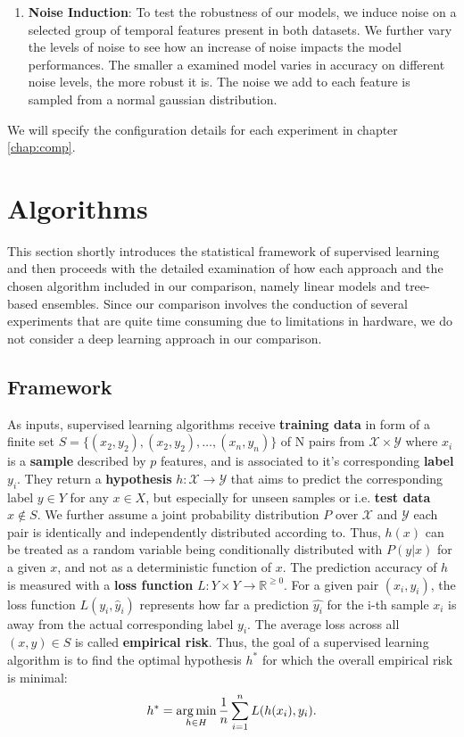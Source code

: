 \begin{enumerate}
	\item \textbf{Noise Induction}: To test the robustness of our models, we induce noise on a selected group of temporal features present in both datasets. We further vary the levels of noise to see how an increase of noise impacts the model performances. The smaller a examined model varies in accuracy on different noise levels, the more robust it is. The noise we add to each feature is sampled from a normal gaussian distribution. 
\end{enumerate}
We will specify the configuration details for each experiment in chapter \ref{chap:comp}.
\section{Algorithms}

This section shortly introduces the statistical framework of supervised learning and then proceeds with the detailed examination of how each approach and the chosen algorithm included in our comparison, namely linear models and tree-based ensembles. Since our comparison involves the conduction of several experiments that are quite time consuming due to limitations in hardware, we do not consider a deep learning approach in our comparison. 

\subsection{Framework}
As inputs, supervised learning algorithms receive \textbf{training data} in form of a finite set $ S = \{({x}_{2}, y_2), ({x}_{2}, y_2), \dots, ({x}_{n}, y_n)\}$ of N pairs from $ \mathcal{X} \times \mathcal{Y} $ where $ x_i $ is a \textbf{sample} described by $ p $ features, and is associated to it's corresponding \textbf{label} $ y_i $.
They return a \textbf{hypothesis} $ h: \mathcal{X} \to \mathcal{Y} $ that aims to predict the corresponding label $ y \in Y $ for any $ x \in X $, but especially for unseen samples or i.e. \textbf{test data} $ x \notin S $.
We further assume a joint probability distribution $ P $ over $ \mathcal{X} $ and $ \mathcal{Y} $ each pair is identically and independently distributed according to. 
Thus, $ h(x) $ can be treated as a random variable being conditionally distributed with $ P(y | x) $ for a given $ x $, and not as a deterministic function of $ x $. 
The prediction accuracy of $ h $ is measured with a  \textbf{loss function} $ L : Y \times Y \to \mathbb{R}^{\geq 0}$.
For a given pair $ ({x}_i, y_i) $, the loss function $ L(y_i, \hat{y}_i) $ represents how far a prediction $ \hat{y_i} $ for the i-th sample $ x_i $ is away from the actual corresponding label $ y_i $. 
The average loss across all $ (x,y) \in S $ is called \textbf{empirical risk}.
Thus, the goal of a supervised learning algorithm is to find the optimal hypothesis $ h^* $ for which the overall empirical risk is minimal: 
\begin{equation}
	h^* = \operatorname*{arg\,min}_{h \in H} \dfrac{1}{n} \sum_{i=1}^{n} L(h(x_i), y_i).
\end{equation}

